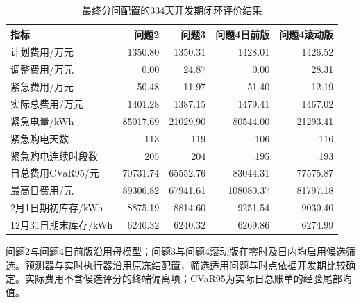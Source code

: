\begin{table}[htbp]\centering\small
\caption{最终分问配置的334天开发期闭环评价结果}
\label{tab:annual_summary}
\begin{tabularx}{\linewidth}{LRRRR}\toprule
指标 & 问题2 & 问题3 & 问题4日前版 & 问题4滚动版\\\midrule
计划费用/万元 & 1350.80 & 1350.31 & 1428.01 & 1426.52\\
调整费用/万元 & 0.00 & 24.87 & 0.00 & 28.31\\
紧急费用/万元 & 50.48 & 11.97 & 51.40 & 12.19\\
实际总费用/万元 & 1401.28 & 1387.15 & 1479.41 & 1467.02\\
紧急电量/kWh & 85017.69 & 21029.90 & 80544.00 & 21293.41\\
紧急购电天数 & 113 & 119 & 106 & 116\\
紧急购电连续时段数 & 205 & 204 & 195 & 193\\
日总费用CVaR95/元 & 70731.74 & 65552.76 & 83044.31 & 77575.87\\
最高日费用/元 & 89306.82 & 67941.61 & 108080.37 & 81797.18\\
2月1日期初库存/kWh & 8875.19 & 8814.60 & 9251.54 & 9030.40\\
12月31日期末库存/kWh & 6240.32 & 6240.32 & 6269.86 & 6274.99\\
\bottomrule\end{tabularx}
\par\smallskip\parbox{\linewidth}{\footnotesize 问题2与问题4日前版沿用母模型；问题3与问题4滚动版在零时及日内均启用候选筛选。预测器与实时执行器沿用原冻结配置，筛选适用问题与时点依据开发期比较确定。实际费用不含候选评分的终端偏离项；CVaR95为实际日总账单的经验尾部均值。}
\end{table}
